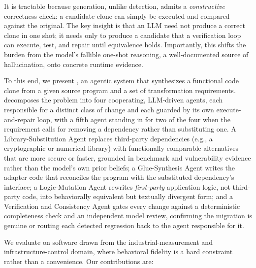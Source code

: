 It is tractable because generation, unlike detection, admits a \emph{constructive} correctness check: a candidate clone can simply be executed and compared against the original. The key insight is that an LLM need not produce a correct clone in one shot; it needs only to produce a candidate that a verification loop can execute, test, and repair until equivalence holds. Importantly, this shifts the burden from the model's fallible one-shot reasoning, a well-documented source of hallucination, onto concrete runtime evidence.

To this end, we present \sys, an agentic system that synthesizes a functional code clone from a given source program and a set of transformation requirements. \sys decomposes the problem into four cooperating, LLM-driven agents, each responsible for a distinct class of change and each guarded by its own execute-and-repair loop, with a fifth agent standing in for two of the four when the requirement calls for removing a dependency rather than substituting one. A Library-Substitution Agent replaces third-party dependencies (e.g., a cryptographic or numerical library) with functionally comparable alternatives that are more secure or faster, grounded in benchmark and vulnerability evidence rather than the model's own prior beliefs; a Glue-Synthesis Agent writes the adapter code that reconciles the program with the substituted dependency's interface; a Logic-Mutation Agent rewrites \emph{first-party} application logic, not third-party code, into behaviorally equivalent but textually divergent form; and a Verification and Consistency Agent gates every change against a deterministic completeness check and an independent model review, confirming the migration is genuine or routing each detected regression back to the agent responsible for it.

We evaluate \sys on software drawn from the industrial-measurement and infrastructure-control domain, where behavioral fidelity is a hard constraint rather than a convenience. Our contributions are:

